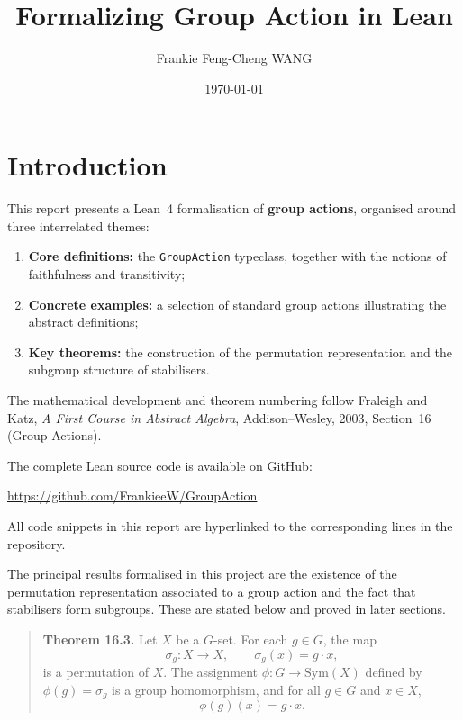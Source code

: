 \documentclass[
  12pt, %
]{assignment}
\title{Formalizing Group Action in Lean} %
\author{Frankie Feng-Cheng WANG} %
\date{\today} %
\institute{Department of Mathematics\\Imperial College London} %
\begin{document}
\maketitle %
\tableofcontents

\section{Introduction}

This report presents a Lean~4 formalisation of \textbf{group actions}, organised around three interrelated themes:
\begin{enumerate}
	\item \textbf{Core definitions:} the \texttt{GroupAction} typeclass, together with the notions of faithfulness and transitivity;
	\item \textbf{Concrete examples:} a selection of standard group actions illustrating the abstract definitions;
	\item \textbf{Key theorems:} the construction of the permutation representation and the subgroup structure of stabilisers.
\end{enumerate}

The mathematical development and theorem numbering follow
Fraleigh and Katz, \textit{A First Course in Abstract Algebra},
Addison--Wesley, 2003, Section~16 (Group Actions).

The complete Lean source code is available on GitHub:

\url{https://github.com/FrankieeW/GroupAction}.

All code snippets in this report are hyperlinked to the corresponding lines in the repository.

The principal results formalised in this project are the existence of the permutation representation associated to a group action and the fact that stabilisers form subgroups. These are stated below and proved in later sections.

\begin{quote}
	\textbf{Theorem 16.3.}
	Let $X$ be a $G$-set. For each $g \in G$, the map
	\[
		\sigma_g : X \to X, \qquad \sigma_g(x) = g \cdot x,
	\]
	is a permutation of $X$. The assignment $\phi : G \to \mathrm{Sym}(X)$ defined by
	$\phi(g) = \sigma_g$ is a group homomorphism, and for all $g \in G$ and $x \in X$,
	\[
		\phi(g)(x) = g \cdot x.
	\]
\end{quote}
\end{document}
